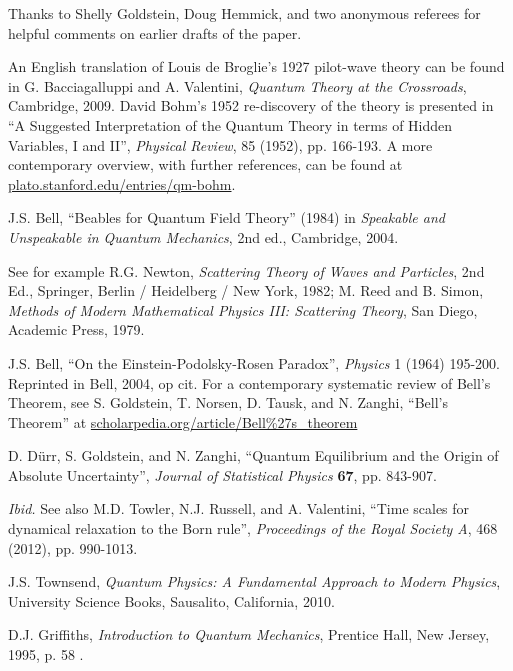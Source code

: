 \documentclass[aps,prc,onecolumn,letterpaper,floatfix,12pt]{revtex4}
\begin{document}
\begin{acknowledgments}
Thanks to Shelly Goldstein, Doug Hemmick, and two anonymous referees
for helpful comments on earlier drafts of the paper. 
\end{acknowledgments}


\begin{thebibliography}{99}

  An English translation of Louis de Broglie's 1927
  pilot-wave theory can be found in G. Bacciagalluppi and
  A. Valentini, \emph{Quantum Theory at the Crossroads}, Cambridge,
  2009.  David Bohm's 1952 re-discovery of the theory is presented in
  ``A Suggested Interpretation of the Quantum Theory in terms of
  Hidden Variables, I and II'', \emph{Physical Review}, 85 (1952),
  pp. 166-193.  A more contemporary overview, with further references,
  can be found at \url{plato.stanford.edu/entries/qm-bohm}.

  J.S. Bell, ``Beables for Quantum Field Theory''
  (1984) in \emph{Speakable and Unspeakable in Quantum Mechanics}, 2nd
  ed., Cambridge, 2004. 

 See for example R.G. Newton, \emph{Scattering
    Theory of Waves and Particles}, 2nd Ed., Springer, Berlin /
  Heidelberg / New York, 1982; M. Reed and B. Simon, \emph{Methods of
    Modern Mathematical Physics III: Scattering Theory}, San Diego,
  Academic Press, 1979.

  J.S. Bell, ``On the Einstein-Podolsky-Rosen
  Paradox'', \emph{Physics} 1 (1964) 195-200.  Reprinted in Bell,
  2004, op cit.  For a contemporary systematic review of Bell's
  Theorem, see S. Goldstein, T. Norsen, D. Tausk, and N. Zanghi,
  ``Bell's Theorem'' at \url{scholarpedia.org/article/Bell\%27s_theorem}

 D. D\"urr, S. Goldstein, and N. Zanghi, ``Quantum
  Equilibrium and the Origin of Absolute Uncertainty'', \emph{Journal
    of Statistical Physics} {\bf{67}}, pp. 843-907.

 \emph{Ibid.}  See also M.D. Towler, N.J. Russell, and
  A. Valentini, ``Time scales for dynamical relaxation to the Born
  rule'', \emph{Proceedings of the Royal Society A}, 468 (2012), pp. 990-1013.

 J.S. Townsend, \emph{Quantum Physics:  A
    Fundamental Approach to Modern Physics}, University Science Books,
  Sausalito, California, 2010.

  D.J. Griffiths, \emph{Introduction to Quantum
   Mechanics}, Prentice Hall, New Jersey, 1995, p. 58 .



\end{thebibliography}
\end{document}
